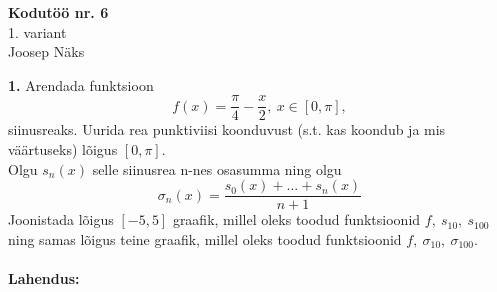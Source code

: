 \documentclass{article}
\begin{document}
\begin{center}
\Large\textbf{Kodutöö nr. 6}\\
1. variant\\
\small{Joosep Näks}
\end{center}
\textbf{1. }Arendada funktsioon$$f(x)=\frac{\pi}4-\frac x2,\ x\in[0,\pi],$$siinusreaks. Uurida rea punktiviisi koonduvust (s.t. kas koondub ja mis väärtuseks) lõigus $[0,\pi]$.\\
Olgu $s_n(x)$ selle siinusrea n-nes osasumma ning olgu $$\sigma_n(x)=\frac{s_0(x)+...+s_n(x)}{n+1}$$ Joonistada lõigus $[-5,5]$ graafik, millel oleks toodud funktsioonid $f,\ s_10,\ s_100$ ning samas lõigus teine graafik, millel oleks toodud funktsioonid $f,\ \sigma_10,\ \sigma_100$.\\\\
\textbf{Lahendus:}\\
\end{document}
